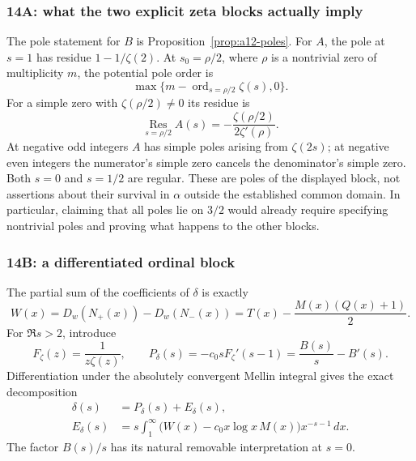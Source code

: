 \documentclass[11pt]{amsart}
\numberwithin{equation}{section}
\theoremstyle{plain}
\theoremstyle{definition}
\theoremstyle{remark}
\begin{document}
\subsubsection{14A: what the two explicit zeta blocks actually imply}
\label{subsubsec:a12-A-poles}
The pole statement for $B$ is Proposition~\ref{prop:a12-poles}.
For $A$, the pole at $s=1$ has residue $1-1/\zeta(2)$.
At $s_0=\rho/2$, where $\rho$ is a nontrivial zero of multiplicity $m$,
the potential pole order is
\begin{equation}
\label{eq:a12-A-order}
\max\{m-\operatorname{ord}_{s=\rho/2}\zeta(s),0\}.
\end{equation}
For a simple zero with $\zeta(\rho/2)\ne0$ its residue is
\begin{equation}
\label{eq:a12-A-residue}
\operatorname*{Res}_{s=\rho/2}A(s)
=-\frac{\zeta(\rho/2)}{2\zeta'(\rho)}.
\end{equation}
At negative odd integers $A$ has simple poles arising from $\zeta(2s)$;
at negative even integers the numerator's simple zero cancels the
denominator's simple zero. Both $s=0$ and $s=1/2$ are regular.
These are poles of the displayed block, not assertions about their
survival in $\alpha$ outside the established common domain.
In particular, claiming that all poles lie on $3/2$ would already require
specifying nontrivial poles and proving what happens to the other blocks.

\subsubsection{14B: a differentiated ordinal block}
\label{subsubsec:a12-delta-model}
The partial sum of the coefficients of $\delta$ is exactly
\begin{equation}
\label{eq:a12-W-pole}
W(x)=D_w(N_+(x))-D_w(N_-(x))
=T(x)-\frac{M(x)(Q(x)+1)}2.
\end{equation}
For $\Re s>2$, introduce
\begin{equation}
\label{eq:a12-Pdelta}
F_\zeta(z)=\frac1{z\zeta(z)},\qquad
P_\delta(s)=-c_0sF_\zeta'(s-1)=\frac{B(s)}s-B'(s).
\end{equation}
Differentiation under the absolutely convergent Mellin integral gives the
exact decomposition
\begin{align}
\delta(s)&=P_\delta(s)+E_\delta(s),\label{eq:a12-delta-split}\\
E_\delta(s)&=s\int_1^\infty
\bigl(W(x)-c_0x\log x\,M(x)\bigr)x^{-s-1}\,dx.
\label{eq:a12-Edelta}
\end{align}
The factor $B(s)/s$ has its natural removable interpretation at $s=0$.
\end{document}

